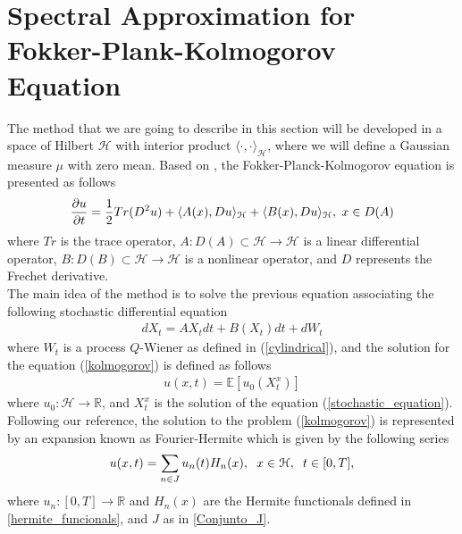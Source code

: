 \section{Spectral Approximation for Fokker-Plank-Kolmogorov Equation}

	The method that we are going to describe in this section will be developed in a space of Hilbert $\mathcal{H}$ with interior product $\langle \cdot, \cdot \rangle_{\mathcal{H}}$, where we will define a Gaussian measure $\mu$ with zero mean. Based on \cite{Delgado2016}, the Fokker-Planck-Kolmogorov equation is presented as follows
	\begin{align}
		\label{kolmogorov}
		\frac{\partial u}{\partial t} = \frac{1}{2} Tr(D^2 u) + \langle A(x), Du\rangle_{\mathcal{H}} + \langle B(x), Du\rangle_{\mathcal{H}}, \hspace{0.1cm} x \in D(A)
	\end{align}
	where $Tr$ is the trace operator, $A: D (A) \subset \mathcal{H} \rightarrow \mathcal{H}$ is a linear differential operator, $B: D (B) \subset \mathcal{H } \rightarrow \mathcal{H}$ is a nonlinear operator, and $D$ represents the Frechet derivative. \\
	
	The main idea of ​​the method is to solve the previous equation associating the following stochastic differential equation
	\begin{align}
		dX_t = AX_t dt + B(X_t) dt + dW_t
		\label{stochastic_equation}
	\end{align}
	where $W_t$ is a process $Q$-Wiener as defined in (\ref{cylindrical}), and the solution for the equation (\ref{kolmogorov}) is defined as follows
	\begin{align}
		u(x, t) = \mathbb{E} \left[ u_0 (X^x_t) \right] 
		\label{solution_kolmogorov}
	\end{align}
	where $u_0: \mathcal{H} \rightarrow \mathbb{R}$, and $X_t^x$ is the solution of the equation (\ref{stochastic_equation}). \\
	
	Following our reference, the solution to the problem (\ref{kolmogorov}) is represented by an expansion known as Fourier-Hermite which is given by the following series
	\begin{align}
		\label{infinite_approximation}
		u(x, t) = \displaystyle \sum_{n \in J} u_n (t) H_n (x), \hspace{2mm} x \in \mathcal{H}, \hspace{2mm} t \in [0, T],
	\end{align}  
	where $u_n : [0, T] \rightarrow \mathbb{R}$ and $H_n (x)$ are the Hermite functionals defined in \ref{hermite_funcionals}, and $J$ as in \ref{Conjunto_J}. \\
	  
